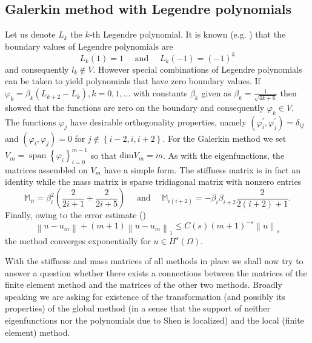 \documentclass[a4paper,10pt]{article}
\newcommand{\norm}[1]{\ensuremath{\left\|#1\right\|}}
\newcommand{\inner}[2]{\ensuremath{\left(#1, #2\right)}}
\newcommand{\Mmat}{\ensuremath{\mathbb{M}}}
\DeclareMathOperator{\spn}{span}
\begin{document}
  \subsection{Galerkin method with Legendre polynomials}
  Let us denote $L_k$ the $k$-th Legendre polynomial. It is known
  (e.g. \cite{shen_book}) that the boundary values of Legendre polynomials are
  \[
    L_k(1) = 1\quad\text{ and }\quad L_k(-1) = (-1)^k
  \]
  and consequently $l_k\notin V$. However special combinations of Legendre
  polynomials can be taken to yield polynomials that have zero boundary values.
  If $\varphi_k=\beta_k\left(L_{k+2} - L_k\right), k=0, 1,\dots$ with constants
  $\beta_k$ given as $\beta_k = \frac{1}{\sqrt{4k + 6}}$ then
  \cite{shen_leg} showed that the functions are zero on the boundary and
  consequently $\varphi_k\in V$. The functions $\varphi_j$ have desirable
  orthogonality properties, namely
  $\inner{\varphi_i^{\prime}}{\varphi_j^{\prime}}=\delta_{ij}$ and
  $\inner{\varphi_i}{\varphi_j}=0$ for $j\notin\left\{i-2, i, i+2\right\}$.
  For the Galerkin method we set $V_m=\spn\left\{\varphi_i\right\}_{i=0}^{m-1}$
  so that $\text{dim}V_m=m$. As with the eigenfunctions, the matrices assembled
  on $V_m$ have a simple form. The stiffness matrix is in fact an identity
  while the mass matrix is sparse tridiagonal matrix with nonzero entries
  \[
    \Mmat_{ii} = \beta_i^2\left(\frac{2}{2i+1}+\frac{2}{2i+5}\right)
    \quad{\text{ and }}\quad
    \Mmat_{i(i+2)} = -\beta_i\beta_{i+2}\frac{2}{2(i+2)+1}.
  \]
  Finally, owing to the error estimate (\cite{shen_leg})
  \[
    \norm{u-u_m} + (m+1)\norm{u-u_m}_1 \leq C(s)(m+1)^{-s}\norm{u}_s
  \]
  the method converges exponentially for $u\in H^s\left({\Omega}\right)$.

  With the stiffness and mass matrices of all methods in place we shall now
  try to answer a question whether there exists a connections between the
  matrices of the finite element method and the matrices of the other two
  methods. Broadly speaking we are asking for existence of the transformation
  (and possibly its properties) of the global method (in a sense that the
  support of neither eigenfunctions nor the polynomials due to Shen is localized)
  and the local (finite element) method.

\end{document}
